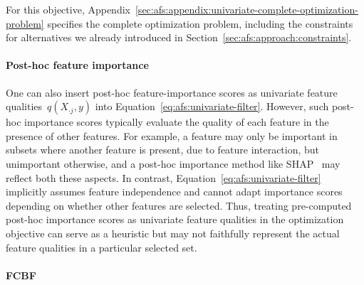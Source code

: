 \documentclass[iicol, sn-basic, Numbered]{sn-jnl} %
\theoremstyle{plain}
\theoremstyle{definition}
\begin{document}
For this objective, Appendix~\ref{sec:afs:appendix:univariate-complete-optimization-problem} specifies the complete optimization problem, including the constraints for alternatives we already introduced in Section~\ref{sec:afs:approach:constraints}.

\paragraph{Post-hoc feature importance}

One can also insert post-hoc feature-importance scores as univariate feature qualities~$q(X_{\cdot{}j},y)$ into Equation~\ref{eq:afs:univariate-filter}.
However, such post-hoc importance scores typically evaluate the quality of each feature in the presence of other features. 
For example, a feature may only be important in subsets where another feature is present, due to feature interaction, but unimportant otherwise, and a post-hoc importance method like SHAP~\cite{lundberg2017unified} may reflect both these aspects.
In contrast, Equation~\ref{eq:afs:univariate-filter} implicitly assumes feature independence and cannot adapt importance scores depending on whether other features are selected.
Thus, treating pre-computed post-hoc importance scores as univariate feature qualities in the optimization objective can serve as a heuristic but may not faithfully represent the actual feature qualities in a particular selected set.

\paragraph{FCBF}
\end{document}
